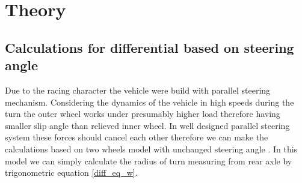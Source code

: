 




\chapter{Theory}

\section{Calculations for differential based on steering angle} \label{diff_calc}

Due to the racing character the vehicle were build with parallel steering mechanism. Considering the dynamics of the vehicle in high speeds during the turn the outer wheel works under presumably higher load therefore having smaller slip angle than relieved inner wheel. In well designed parallel steering system these forces should cancel each other therefore we can make the calculations based on two wheels model with unchanged steering angle .
In this model we can simply calculate the radius of turn measuring from rear axle by trigonometric equation \ref{diff_eq_w}.

